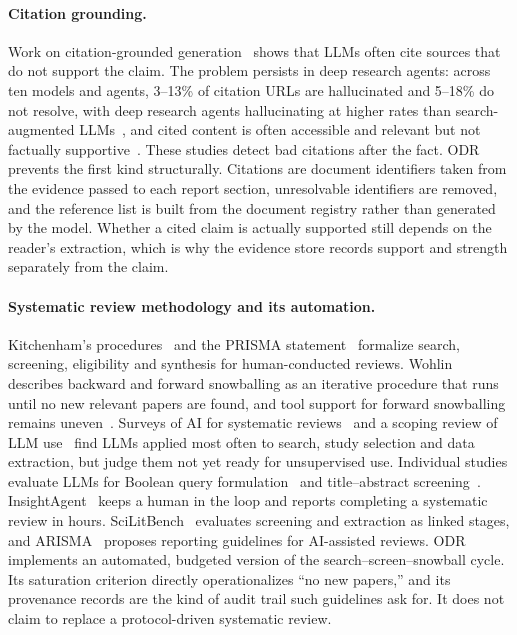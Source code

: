 \documentclass{article}
\newcommand{\sys}{ODR}
\begin{document}
\paragraph{Citation grounding.}
Work on citation-grounded generation~\citep{gao2023alce} shows that LLMs
often cite sources that do not support the claim. The problem persists in
deep research agents: across ten models and agents, 3--13\% of citation
URLs are hallucinated and 5--18\% do not resolve, with deep research agents
hallucinating at higher rates than search-augmented
LLMs~\citep{rao2026referencehallucinations}, and cited content is often
accessible and relevant but not factually
supportive~\citep{onweller2026citedbutnotverified}. These studies detect
bad citations after the fact. \sys{} prevents the first kind
structurally. Citations are document identifiers taken from the evidence
passed to each report section, unresolvable identifiers are removed, and
the reference list is built from the document registry rather than
generated by the model. Whether a cited claim is actually supported still
depends on the reader's extraction, which is why the evidence store
records support and strength separately from the claim.

\paragraph{Systematic review methodology and its automation.}
Kitchenham's procedures~\citep{kitchenham2004procedures, kitchenham2007guidelines} and the PRISMA
statement~\citep{page2021prisma} formalize search, screening, eligibility
and synthesis for human-conducted reviews. Wohlin~\citep{wohlin2014guidelines}
describes backward and forward snowballing as an iterative procedure that
runs until no new relevant papers are found, and tool support for forward
snowballing remains uneven~\citep{januario2025forwardsnowballing}. Surveys
of AI for systematic reviews~\citep{bolanos2024aireviews} and a scoping
review of LLM use~\citep{lieberum2025llmsr} find LLMs applied most often to
search, study selection and data extraction, but judge them not yet ready
for unsupervised use. Individual studies evaluate LLMs for Boolean query
formulation~\citep{wang2023booleanquery} and title--abstract
screening~\citep{syriani2023screening}. InsightAgent~\citep{qiu2025insightagent}
keeps a human in the loop and reports completing a systematic review in
hours. SciLitBench~\citep{zabaleta2026scilitbench} evaluates screening and
extraction as linked stages, and ARISMA~\citep{moghaddam2026arisma}
proposes reporting guidelines for AI-assisted reviews. \sys{} implements
an automated, budgeted version of the search--screen--snowball cycle. Its
saturation criterion directly operationalizes ``no new papers,'' and its
provenance records are the kind of audit trail such guidelines ask for.
It does not claim to replace a protocol-driven systematic review.
\end{document}
